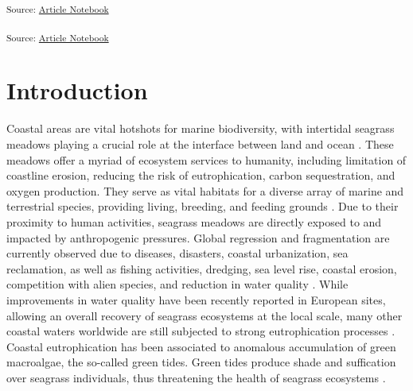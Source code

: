 \documentclass[
  number]{elsarticle}
\begin{document}
\textsubscript{Source:
\href{https://SigOiry.github.io/Drone_Paper_2023/index.qmd.html}{Article
Notebook}}

\textsubscript{Source:
\href{https://SigOiry.github.io/Drone_Paper_2023/index.qmd.html}{Article
Notebook}}

\section{Introduction}\label{introduction}

Coastal areas are vital hotshots for marine biodiversity, with
intertidal seagrass meadows playing a crucial role at the interface
between land and ocean \citep{unsworth2022}. These meadows offer a
myriad of ecosystem services to humanity, including limitation of
coastline erosion, reducing the risk of eutrophication, carbon
sequestration, and oxygen production. They serve as vital habitats for a
diverse array of marine and terrestrial species, providing living,
breeding, and feeding grounds \citetext{\citealp[
]{gardner2018}; \citealp[ ]{Zoffoli2022}; \citealp{jankowska2019}}. Due
to their proximity to human activities, seagrass meadows are directly
exposed to and impacted by anthropogenic pressures. Global regression
and fragmentation are currently observed due to diseases, disasters,
coastal urbanization, sea reclamation, as well as fishing activities,
dredging, sea level rise, coastal erosion, competition with alien
species, and reduction in water quality \citetext{\citealp[
]{nguyen2021}; \citealp[ ]{soissons2018}; \citealp[
]{orth2006}; \citealp[ ]{lin2018}; \citealp{duffy2019}}. While
improvements in water quality have been recently reported in European
sites, allowing an overall recovery of seagrass ecosystems at the local
scale, many other coastal waters worldwide are still subjected to strong
eutrophication processes \citetext{\citealp[
]{deSantos2019}; \citealp{Zoffoli2021}}. Coastal eutrophication has been
associated to anomalous accumulation of green macroalgae, the so-called
green tides. Green tides produce shade and suffication over seagrass
individuals, thus threatening the health of seagrass ecosystems
\citetext{\citealp[ ]{Duarte2002}; \citealp{wang2022}}.
\end{document}
